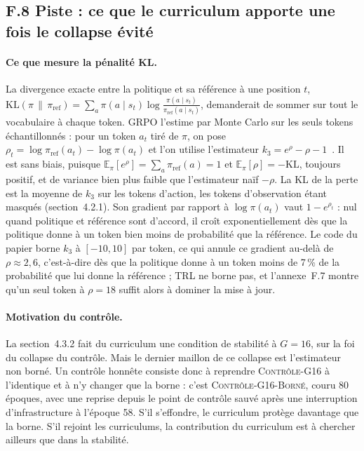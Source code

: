 \documentclass[11pt,a4paper]{article}
\begin{document}
\subsection*{F.8 Piste : ce que le curriculum apporte une fois le collapse évité}

\paragraph{Ce que mesure la pénalité KL.} La divergence exacte entre la politique et sa référence à une position $t$, $\mathrm{KL}(\pi \,\|\, \pi_{\mathrm{ref}}) = \sum_{a} \pi(a \mid s_t) \log \frac{\pi(a \mid s_t)}{\pi_{\mathrm{ref}}(a \mid s_t)}$, demanderait de sommer sur tout le vocabulaire à chaque token. GRPO l'estime par Monte Carlo sur les seuls tokens échantillonnés : pour un token $a_t$ tiré de $\pi$, on pose $\rho_t = \log \pi_{\mathrm{ref}}(a_t) - \log \pi(a_t)$ et l'on utilise l'estimateur $k_3 = e^{\rho} - \rho - 1$~\cite{schulman2020kl}. Il est sans biais, puisque $\mathbb{E}_{\pi}[e^{\rho}] = \sum_a \pi_{\mathrm{ref}}(a) = 1$ et $\mathbb{E}_{\pi}[\rho] = -\mathrm{KL}$, toujours positif, et de variance bien plus faible que l'estimateur naïf $-\rho$. La KL de la perte est la moyenne de $k_3$ sur les tokens d'action, les tokens d'observation étant masqués (section~4.2.1). Son gradient par rapport à $\log \pi(a_t)$ vaut $1 - e^{\rho_t}$ : nul quand politique et référence sont d'accord, il croît exponentiellement dès que la politique donne à un token bien moins de probabilité que la référence. Le code du papier borne $k_3$ à $[-10, 10]$ par token, ce qui annule ce gradient au-delà de $\rho \approx 2{,}6$, c'est-à-dire dès que la politique donne à un token moins de 7\,\% de la probabilité que lui donne la référence ; TRL ne borne pas, et l'annexe~F.7 montre qu'un seul token à $\rho = 18$ suffit alors à dominer la mise à jour.

\paragraph{Motivation du contrôle.} La section~4.3.2 fait du curriculum une condition de stabilité à $G=16$, sur la foi du collapse du contrôle. Mais le dernier maillon de ce collapse est l'estimateur non borné. Un contrôle honnête consiste donc à reprendre \textsc{Contrôle-G16} à l'identique et à n'y changer que la borne : c'est \textsc{Contrôle-G16-Borné}, couru 80 époques, avec une reprise depuis le point de contrôle sauvé après une interruption d'infrastructure à l'époque 58. S'il s'effondre, le curriculum protège davantage que la borne. S'il rejoint les curriculums, la contribution du curriculum est à chercher ailleurs que dans la stabilité.
\end{document}
